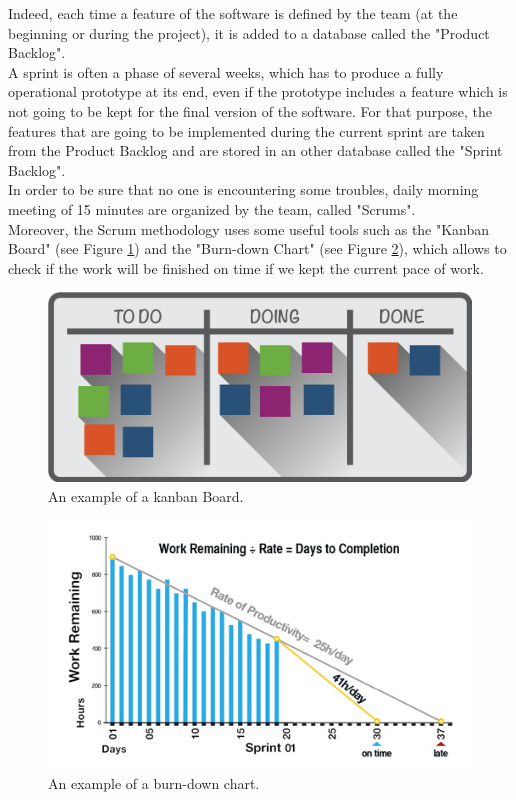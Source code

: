 \documentclass[a4paper]{report}
\begin{document}
\vspace{1cm}
Indeed, each time a feature of the software is defined by the team (at the beginning or during the project), it is added to a database called the "Product Backlog". \\

A sprint is often a phase of several weeks, which has to produce a fully operational prototype at its end, even if the prototype includes a feature which is not going to be kept for the final version of the software. For that purpose, the features that are going to be implemented during the current sprint are taken from the Product Backlog and are stored in an other database called the "Sprint Backlog".\\

In order to be sure that no one is encountering some troubles, daily morning meeting of 15 minutes are organized by the team, called "Scrums".\\

Moreover, the Scrum methodology uses some useful tools such as the "Kanban Board" (see Figure \ref{fig:kanban}) and the "Burn-down Chart" (see Figure \ref{fig:burndown_chart}), which allows to check if the work will be finished on time if we kept the current pace of work.\\

\vspace{1cm}

\begin{figure}[H]
	\centering
	\includegraphics[width=0.7\linewidth]{image/kanban-1.jpg}
	\caption{An example of a kanban Board.}
	\label{fig:kanban}
\end{figure}

\begin{figure}[H]
	\centering
	\includegraphics[width=0.7\linewidth]{image/burndown-chart-formula.jpg}
	\caption{An example of a burn-down chart.}
	\label{fig:burndown_chart}
\end{figure}
\end{document}
